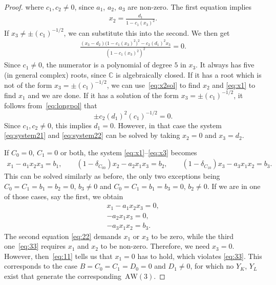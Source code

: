 \documentclass[10pt,a4paper]{amsart}
\numberwithin{equation}{section}
\newcommand{\CC}{\mathbb{C}}
\newcommand{\aw}{\mathrm{AW}\!\left(3\right)}
\begin{document}
\begin{proof}
	where $c_1,c_2\neq0$, since $a_1$, $a_2$, $a_3$ are non-zero.
	The first equation implies
	\begin{gather}
		x_2=\frac{d_1}{1-c_1(x_3)^2}.\label{eq:x2sol}
	\end{gather}
	If $x_3\neq \pm (c_1)^{-1/2}$, we can substitute this into the second. We then get
	\begin{gather}
		\frac{(x_3-d_2)\big(1-c_1(x_3)^2\big)^2-c_2(d_1)^2x_3}{(1-c_1(x_3)^2)^2}=0.\label{eq:longpol}
	\end{gather}
	Since $c_1\neq 0$, the numerator is a polynomial of degree $5$ in $x_3$. It always has five (in general complex) roots, since $\CC$ is algebraically closed. If it has a root which is not of the form $x_3= \pm (c_1)^{-1/2}$, we can use~\eqref{eq:x2sol} to find $x_2$ and \eqref{eq:x1} to find $x_1$ and we are done. If it has a solution of the form $x_3= \pm (c_1)^{-1/2}$, it follows from~\eqref{eq:longpol} that
	\[
	\pm c_2(d_1)^2(c_1)^{-1/2}=0.
	\]
Since $c_1,c_2\neq0$, this implies $d_1=0$.
However, in that case the system \eqref{eq:system21} and \eqref{eq:system22} can be solved by taking $x_2=0$ and $x_3=d_2$.

	If $C_0=0$, $C_1=0$ or both, the system \eqref{eq:x1}--\eqref{eq:x3} becomes
	\begin{gather*}
		x_1-a_1x_2x_3=b_1,\qquad
		(1-\delta_{C_00})x_2-a_2x_1x_3=b_2,\qquad
		(1-\delta_{C_10})x_3-a_3x_1x_2=b_3.
	\end{gather*}
	This can be solved similarly as before, the only two exceptions being $C_0=C_1=b_1=b_2=0$, $b_3\neq0$ and $C_0=C_1=b_1=b_3=0$, $b_2\neq0$. If we are in one of those cases, say the first, we obtain
	\begin{gather}
		x_1-a_1x_2x_3=0,\label{eq:11}\\
		-a_2x_1x_3=0,\label{eq:22}\\
		-a_3x_1x_2=b_3.\label{eq:33}
	\end{gather}
	The second equation \eqref{eq:22} demands $x_1$ or $x_3$ to be zero, while the third one~\eqref{eq:33} requires $x_1$ and $x_2$ to be non-zero. Therefore, we need $x_3=0$. However, then~\eqref{eq:11} tells us that $x_1=0$ has to hold, which violates \eqref{eq:33}. This corresponds to the case $B=C_0=C_1=D_0=0$ and $D_1\neq 0$, for which no $Y_K$, $Y_L$ exist that generate the corresponding~$\aw$.
\end{proof}
\end{document}
